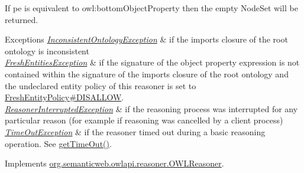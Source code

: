 If {\ttfamily pe} is equivalent to {\ttfamily owl\-:bottom\-Object\-Property} then the empty {\ttfamily Node\-Set} will be returned.


\begin{DoxyExceptions}{Exceptions}
{\em \hyperlink{classorg_1_1semanticweb_1_1owlapi_1_1reasoner_1_1_inconsistent_ontology_exception}{Inconsistent\-Ontology\-Exception}} & if the imports closure of the root ontology is inconsistent \\
\hline
{\em \hyperlink{classorg_1_1semanticweb_1_1owlapi_1_1reasoner_1_1_fresh_entities_exception}{Fresh\-Entities\-Exception}} & if the signature of the object property expression is not contained within the signature of the imports closure of the root ontology and the undeclared entity policy of this reasoner is set to \hyperlink{enumorg_1_1semanticweb_1_1owlapi_1_1reasoner_1_1_fresh_entity_policy_a762eae6d5b2449d125311ecaabfdc8d0}{Fresh\-Entity\-Policy\#\-D\-I\-S\-A\-L\-L\-O\-W}. \\
\hline
{\em \hyperlink{classorg_1_1semanticweb_1_1owlapi_1_1reasoner_1_1_reasoner_interrupted_exception}{Reasoner\-Interrupted\-Exception}} & if the reasoning process was interrupted for any particular reason (for example if reasoning was cancelled by a client process) \\
\hline
{\em \hyperlink{classorg_1_1semanticweb_1_1owlapi_1_1reasoner_1_1_time_out_exception}{Time\-Out\-Exception}} & if the reasoner timed out during a basic reasoning operation. See \hyperlink{classorg_1_1semanticweb_1_1owlapi_1_1reasoner_1_1impl_1_1_o_w_l_reasoner_base_af55342eaaabb1b72dacfde7a181b93d2}{get\-Time\-Out()}. \\
\hline
\end{DoxyExceptions}


Implements \hyperlink{interfaceorg_1_1semanticweb_1_1owlapi_1_1reasoner_1_1_o_w_l_reasoner_a63bd4a8c777d621c1cb8b3000596b631}{org.\-semanticweb.\-owlapi.\-reasoner.\-O\-W\-L\-Reasoner}.

